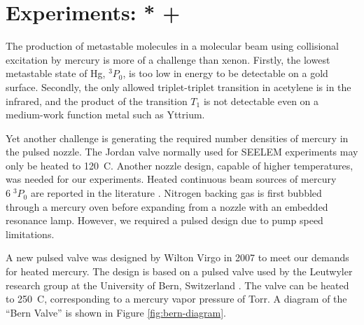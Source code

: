 \documentclass[12pt]{mitthesis}
\begin{document}
\section{Experiments: * + }

The production of metastable molecules in a molecular beam using
collisional excitation by mercury is more of a challenge than xenon.
Firstly, the lowest metastable state of Hg, $^3P_0$, is too low in
energy to be detectable on a gold surface.  Secondly, the only allowed
triplet-triplet transition in acetylene is in the infrared, and the
product of the transition $T_1$ is not detectable even on a
medium-work function metal such as Yttrium.

Yet another challenge is generating the required number densities of
mercury in the pulsed nozzle.  The Jordan valve normally used for
SEELEM experiments may only be heated to 120\degrees\ C.  Another
nozzle design, capable of higher temperatures, was needed for our
experiments.  Heated continuous beam sources of mercury $6 \; ^3P_0$
are reported in the literature \cite{haberman75, obi83}.  Nitrogen
backing gas is first bubbled through a mercury oven before expanding
from a nozzle with an embedded resonance lamp.  However, we required a
pulsed design due to pump speed limitations.  

A new pulsed valve was designed by Wilton Virgo in 2007 to meet our
demands for heated mercury.  The design is based on a pulsed valve
used by the Leutwyler research group at the University of Bern,
Switzerland \cite{tanner06, mueller99}.  The valve can be heated to
250\degrees\ C, corresponding to a mercury vapor pressure of  Torr.  A diagram of the ``Bern Valve''
is shown in Figure \ref{fig:bern-diagram}.
\end{document}
